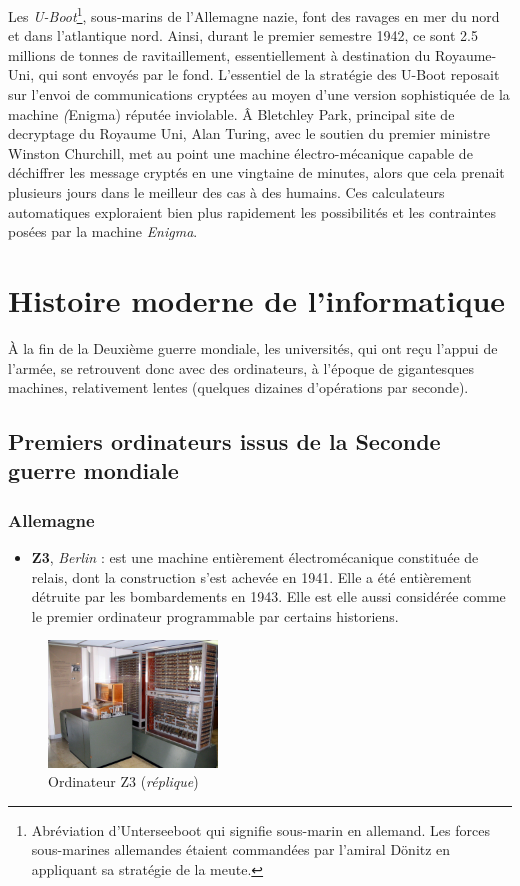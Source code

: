 \documentclass[a4paper,11pt]{book}
\begin{document}
Les \textit{U-Boot}\footnote{Abréviation d'Unterseeboot qui signifie sous-marin en allemand. Les forces sous-marines allemandes étaient commandées par l'amiral Dönitz en appliquant sa stratégie de la meute.}, sous-marins de l'Allemagne nazie, font des ravages en mer du nord et dans l'atlantique nord. Ainsi, durant le premier semestre 1942, ce sont 2.5 millions de tonnes de ravitaillement, essentiellement à destination du Royaume-Uni, qui sont envoyés par le fond. L'essentiel de la stratégie des U-Boot reposait sur l'envoi de communications cryptées au moyen d'une version sophistiquée de la machine \textit(Enigma) réputée inviolable.
Â Bletchley Park, principal site de decryptage du Royaume Uni, Alan Turing, avec le soutien du premier ministre Winston Churchill, met au point une machine électro-mécanique capable de déchiffrer les message cryptés en une vingtaine de minutes, alors que cela  prenait plusieurs jours dans le meilleur des cas à des humains. Ces calculateurs automatiques exploraient bien plus rapidement les possibilités et les contraintes posées par la machine \textit{Enigma}.

\section{Histoire moderne de l'informatique}
À la fin de la Deuxième guerre mondiale, les universités, qui ont reçu l'appui de l'armée, se retrouvent donc avec des ordinateurs, à l'époque de gigantesques machines, relativement lentes (quelques dizaines d'opérations par seconde).
\subsection{Premiers ordinateurs issus de la Seconde guerre mondiale}
\subsubsection{Allemagne}
\begin{itemize}
    \item \textbf{Z3}, \textit{Berlin} : est une machine entièrement électromécanique constituée de relais, dont la construction s'est achevée en 1941. Elle a été entièrement détruite par les bombardements en 1943. Elle est elle aussi considérée comme le premier ordinateur programmable par certains historiens. 
\end{itemize}

\begin{figure} 
    \centering
    \includegraphics[width=0.4\textwidth]{media/machines/Z3_Deutsches_Museum.jpeg}
    \caption{Ordinateur Z3 (\textit{réplique})}
\end{figure}
\end{document}
